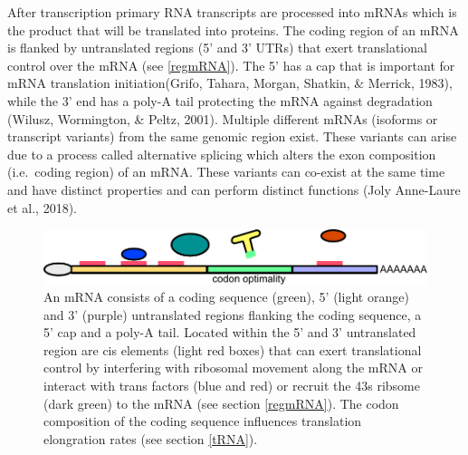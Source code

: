\documentclass[12pt,openany]{book}
\begin{document}
After transcription primary RNA transcripts are processed into mRNAs
which is the product that will be translated into proteins. The coding
region of an mRNA is flanked by untranslated regions (5' and 3' UTRs)
that exert translational control over the mRNA (see \ref{regmRNA}). The
5' has a cap that is important for mRNA translation initiation(Grifo,
Tahara, Morgan, Shatkin, \& Merrick, 1983), while the 3' end has a
poly-A tail protecting the mRNA against degradation (Wilusz, Wormington,
\& Peltz, 2001). Multiple different mRNAs (isoforms or transcript
variants) from the same genomic region exist. These variants can arise
due to a process called alternative splicing which alters the exon
composition (i.e.~coding region) of an mRNA. These variants can co-exist
at the same time and have distinct properties and can perform distinct
functions (Joly Anne-Laure et al., 2018).

\begin{figure}
  \includegraphics{./figures/UTRFeatures.pdf}
  \caption{ An mRNA consists of a coding sequence (green), 5' (light orange) and 3' (purple) untranslated regions flanking the coding sequence, a 5' cap and a poly-A tail. Located within the 5' and 3' untranslated region are cis elements (light red boxes) that can exert translational control by interfering with ribosomal movement along the mRNA or interact with trans factors (blue and red) or recruit the 43s ribsome (dark green) to the mRNA (see section \ref{regmRNA}). The codon composition of the coding sequence influences translation elongration rates (see section \ref{tRNA}).   
 \label{fig:UTRFeat}}
\end{figure}

\clearpage
\end{document}
